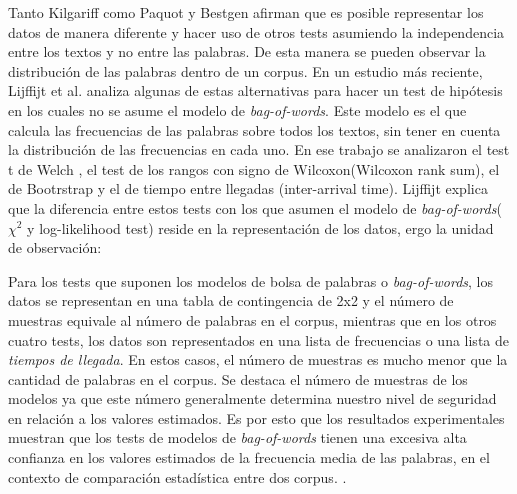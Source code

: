 Tanto Kilgariff \cite{kilgarriff2001comparing} como Paquot y Bestgen \cite{paquot2009distinctive} afirman que es posible representar los datos de manera diferente y hacer uso de otros tests asumiendo la independencia entre los textos y no entre las palabras. De esta manera se pueden observar la distribución de las palabras dentro de un corpus. En un estudio más reciente, Lijffijt et al. \cite{lijffijtsignificance} analiza algunas de estas alternativas para hacer un test de hipótesis en los cuales no se asume el modelo de \textit{bag-of-words}. Este modelo es el que calcula las frecuencias de las palabras sobre todos los textos, sin tener en cuenta la distribución de las frecuencias en cada uno.  En ese trabajo se analizaron el test t de Welch \cite{welch1947generalization}, el test de los rangos con signo de Wilcoxon(Wilcoxon rank sum), el de Bootrstrap y el de tiempo entre llegadas (inter-arrival time). Lijffijt explica que la diferencia entre estos tests con los que asumen el modelo de \textit{bag-of-words}( ${\chi}^2$ y log-likelihood test) reside en la representación de los datos, ergo la unidad de observación:

Para los tests que suponen los modelos de bolsa de palabras o \textit{bag-of-words}, los datos se representan en una tabla de contingencia de 2x2 y el número de muestras equivale al número de palabras en el corpus, mientras que en los otros cuatro tests, los datos son representados en una lista de frecuencias o una lista de \textit{tiempos de llegada}. En estos casos, el número de muestras es mucho menor que la cantidad de palabras en el corpus. Se destaca el número de muestras de los modelos ya que este número generalmente determina nuestro nivel de seguridad en relación a los valores estimados. Es por esto que los resultados experimentales muestran que los tests de modelos de \textit{bag-of-words} tienen una excesiva alta confianza en los valores estimados de la frecuencia media de las palabras, en el contexto de comparación estadística entre dos corpus. \cite{lijffijtsignificance}.


